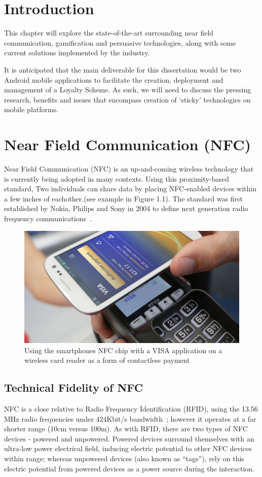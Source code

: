\section{Introduction}
This chapter will explore the state-of-the-art surrounding near field communication, gamification and persuasive technologies, along with some current solutions implemented by the industry.

It is anticipated that the main deliverable for this dissertation would be two Android mobile applications to facilitate the creation, deployment and management of a Loyalty Scheme. As such, we will need to discuss the pressing research, benefits and issues that encompass creation of `sticky' technologies on mobile platforms. 

\section{Near Field Communication (NFC)}
Near Field Communication (NFC) is an up-and-coming wireless technology that is currently being adopted in many contexts. Using this proximity-based standard, Two individuals can share data by placing NFC-enabled devices within a few inches of eachother.(see example in Figure 1.1). The standard was first established by Nokia, Philips and Sony in 2004 to define next generation radio frequency communications~\cite{nfcforum}.
\begin{figure}[H]
  \centering
    \includegraphics[width=1\textwidth]{img/visa-nfc-samsung.jpg}
      \caption{Using the smartphones NFC chip with a VISA application on a wireless card reader as a form of contactless payment}
\end{figure}

\subsection{Technical Fidelity of NFC}
NFC is a close relative to Radio Frequency Identification (RFID), using the 13.56 MHz radio frequencies under 424Kbit/s bandwidth~\cite{nfcloyal}; however it operates at a far shorter range (10cm versus 100m). As with RFID, there are two types of NFC devices - powered and unpowered. Powered devices surround themselves with an ultra-low power electrical field, inducing electric potential to other NFC devices within range; whereas unpowered devices (also known as ``tags''), rely on this electric potential from powered devices as a power source during the interaction.

